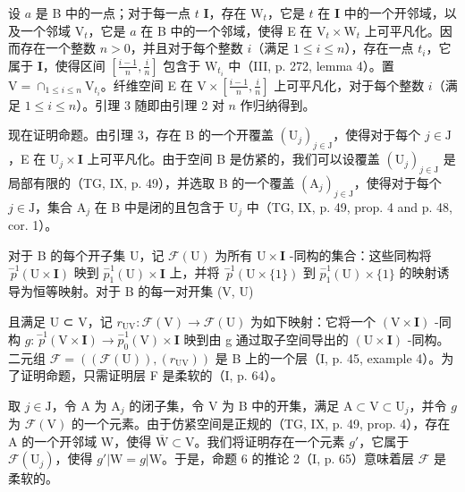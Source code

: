 设 \(a\) 是 B 中的一点；对于每一点 \(t\) \(\mathbf{I}\)，存在 \(\mathrm{W}_t\)，它是 \(t\) 在 \(\mathbf{I}\) 中的一个开邻域，以及一个邻域 \(\mathrm{V}_t\)，它是 \(a\) 在 B 中的一个邻域，使得 E 在 \(\mathrm{V}_t \times \mathrm{W}_t\) 上可平凡化。因而存在一个整数 \(n > 0\)，并且对于每个整数 \(i\)（满足 \(1 \leqslant i \leqslant n\)），存在一点 \(t_i\)，它属于 \(\mathbf{I}\)，使得区间 \([\frac{i-1}{n}, \frac{i}{n}]\) 包含于 \(\mathrm{W}_{t_i}\) 中（III, p. 272, lemma 4）。置 \(\mathrm{V} = \cap_{1 \leqslant i \leqslant n} \mathrm{V}_{t_i}\)。纤维空间 E 在 \(\mathrm{V} \times [\frac{i-1}{n}, \frac{i}{n}]\) 上可平凡化，对于每个整数 \(i\)（满足 \(1 \leqslant i \leqslant n\)）。引理 3 随即由引理 2 对 \(n\) 作归纳得到。

现在证明命题。由引理 3，存在 B 的一个开覆盖 \((\mathrm{U}_j)_{j\in \mathrm{J}}\)，使得对于每个 \(j\in \mathrm{J}\)，E 在 \(\mathrm{U}_j\times \mathbf{I}\) 上可平凡化。由于空间 B 是仿紧的，我们可以设覆盖 \((\mathrm{U}_j)_{j\in \mathrm{J}}\) 是局部有限的（TG, IX, p. 49），并选取 B 的一个覆盖 \((\mathrm{A}_j)_{j\in \mathrm{J}}\)，使得对于每个 \(j\in \mathrm{J}\)，集合 \(\mathrm{A}_j\) 在 B 中是闭的且包含于 \(\mathrm{U}_j\) 中（TG, IX, p. 49, prop. 4 and p. 48, cor. 1）。

对于 B 的每个开子集 U，记 \(\mathcal{F}(\mathrm{U})\) 为所有 \(\mathrm{U}\times\mathbf{I}\) -同构的集合：这些同构将 \(\stackrel{-1}{p}(\mathrm{U}\times\mathbf{I})\) 映到 \(\stackrel{-1}{p_{1}}(\mathrm{U})\times\mathbf{I}\) 上，并将 \(\stackrel{-1}{p}(\mathrm{U}\times\{1\})\) 到 \(\stackrel{-1}{p_{1}}(\mathrm{U})\times\{1\}\) 的映射诱导为恒等映射。对于 B 的每一对开集 (V, U)

且满足 U ⊂ V，记 \(r_{\mathrm{UV}} \colon \mathcal{F}(\mathrm{V}) \to \mathcal{F}(\mathrm{U})\) 为如下映射：它将一个 \((\mathrm{V} \times \mathbf{I})\) -同构 \(g \colon \stackrel{-1}{p}(\mathrm{V} \times \mathbf{I}) \to \stackrel{-1}{p_0}(\mathrm{V}) \times \mathbf{I}\) 映到由 g 通过取子空间导出的 \((\mathrm{U} \times \mathbf{I})\) -同构。二元组 \(\mathcal{F} = ((\mathcal{F}(\mathrm{U})), (r_{\mathrm{UV}}))\) 是 B 上的一个层（I, p. 45, example 4）。为了证明命题，只需证明层 F 是柔软的（I, p. 64）。

取 \(j \in \mathrm{J}\)，令 A 为 \(\mathrm{A}_j\) 的闭子集，令 V 为 B 中的开集，满足 \(\mathrm{A} \subset \mathrm{V} \subset \mathrm{U}_j\)，并令 \(g\) 为 \(\mathcal{F}(\mathrm{V})\) 的一个元素。由于仿紧空间是正规的（TG, IX, p. 49, prop. 4），存在 A 的一个开邻域 W，使得 \(\overline{\mathrm{W}} \subset \mathrm{V}\)。我们将证明存在一个元素 \(g'\)，它属于 \(\mathcal{F}(\mathrm{U}_j)\)，使得 \(g' | \mathrm{W} = g | \mathrm{W}\)。于是，命题 6 的推论 2（I, p. 65）意味着层 \(\mathcal{F}\) 是柔软的。

